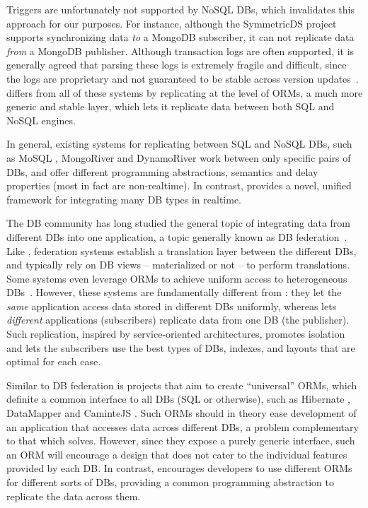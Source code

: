 Triggers are unfortunately not supported by NoSQL DBs, which invalidates this approach for our purposes.
For instance, although the SymmetricDS \cite{symmetricDS} project supports synchronizing data \emph{to} a MongoDB subscriber, it can not replicate data \emph{from} a MongoDB publisher.
Although transaction logs are often supported, it is
generally agreed that parsing these logs is extremely fragile and difficult,
since the logs are proprietary and not guaranteed to be stable across version
updates~\cite{databus}.  \synapse differs from all of these systems by
replicating at the level of ORMs, a much more generic and stable layer, which
lets it replicate data between both SQL and NoSQL engines.

In general, existing systems for replicating between SQL and NoSQL DBs, such as MoSQL \cite{mosql}, MongoRiver \cite{mongo-es-river} and DynamoRiver \cite{dynamo-es-river} work between only specific pairs of DBs, and offer different programming abstractions, semantics and delay properties (most in fact are non-realtime).
In contrast, \synapse provides a novel, unified framework for integrating
many DB types in realtime.

The DB community has long studied the general topic of integrating data from
different DBs into one application, a topic generally known as DB
federation~\cite{ramakrishnan2003database}. Like \synapse, federation systems
establish a translation layer between the different DBs, and typically rely on
DB views -- materialized or not -- to perform translations.  Some systems even
leverage ORMs to achieve uniform access to heterogeneous
DBs~\cite{conf/otm/BalstersH09}. However, these systems are fundamentally
different from \synapse: they let the {\em same} application access data
stored in different DBs uniformly, whereas \synapse lets {\em different}
applications (subscribers) replicate data from one DB (the publisher).  Such
replication, inspired by service-oriented architectures, promotes isolation
and lets the subscribers use the best types of DBs, indexes, and layouts that
are optimal for each case.

Similar to DB federation is projects that aim to create ``universal'' ORMs, which definite a common interface to all DBs (SQL or otherwise), such as Hibernate \cite{hibernate}, DataMapper \cite{datamapper} and CaminteJS \cite{camintejs}.
Such ORMs should in theory ease development of an application that accesses data across different DBs, a problem complementary to that which \synapse solves.
However, since they expose a purely generic interface, such an ORM will encourage a design that does not cater to the individual features provided by each DB.
In contrast, \synapse encourages developers to use different ORMs for different sorts of DBs, providing a common programming abstraction to replicate the data across them.


